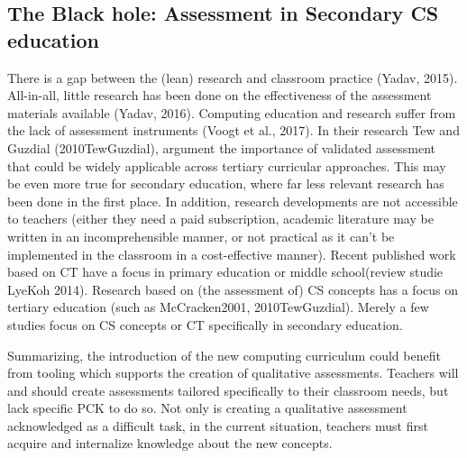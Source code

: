 \subsection{The Black hole: Assessment in Secondary CS education}
There is a gap between the (lean) research and classroom practice (Yadav, 2015). All-in-all, little research has been done on the effectiveness of the assessment materials available (Yadav, 2016). Computing education and research suffer from the lack of assessment instruments (Voogt et al., 2017). In their research Tew and Guzdial (2010TewGuzdial), argument the importance of validated assessment that could be widely applicable across tertiary curricular approaches. This may be even more true for secondary education, where far less relevant research has been done in the first place. In addition, research developments are not accessible to teachers (either they need a paid subscription, academic literature may be written in an incomprehensible manner, or not practical as it can’t be implemented in the classroom in a cost-effective manner). Recent published work based on CT have a focus in primary education or middle school(review studie LyeKoh 2014). Research based on (the assessment of) CS concepts has a focus on tertiary education (such as McCracken2001, 2010TewGuzdial). Merely a few studies focus on CS concepts or CT specifically in secondary education.


Summarizing, the introduction of the new computing curriculum could benefit from tooling which supports the creation of qualitative assessments. Teachers will and should create assessments tailored specifically to their classroom needs, but lack specific PCK to do so. Not only is creating a qualitative assessment acknowledged as a difficult task, in the current situation, teachers must first acquire and internalize knowledge about the new concepts.
